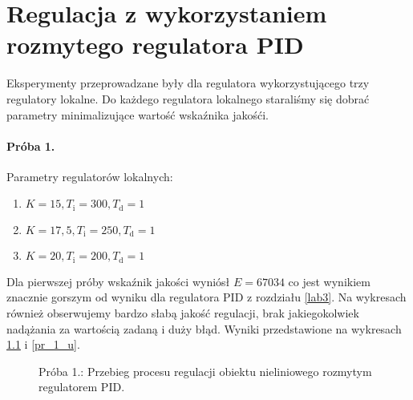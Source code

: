 \chapter{Regulacja z wykorzystaniem rozmytego regulatora PID}
\label{lab4}

Eksperymenty przeprowadzane były dla regulatora wykorzystującego trzy regulatory lokalne. Do każdego regulatora lokalnego staraliśmy się dobrać parametry minimalizujące wartość wskaźnika jakośći.

\subsubsection{Próba 1.}
Parametry regulatorów lokalnych:
\begin{enumerate}
\item $K = 15, T_{\mathrm{i}} = 300,  T_{\mathrm{d}} = 1$
\item $K = 17,5, T_{\mathrm{i}} = 250,  T_{\mathrm{d}} = 1$
\item $K = 20, T_{\mathrm{i}} = 200,  T_{\mathrm{d}} = 1$
\end{enumerate}

Dla pierwszej próby wskaźnik jakości wyniósł $E = \num{67034}$ co jest wynikiem znacznie gorszym od wyniku dla regulatora PID z rozdziału \ref{lab3}. Na wykresach również obserwujemy bardzo słabą jakość regulacji, brak jakiegokolwiek nadążania za wartością zadaną i duży błąd. Wyniki przedstawione na wykresach \ref{pr_1_y} i \ref{pr_1_u}.

\begin{figure}[t]
    \centering
    \caption{Próba 1.: Przebieg procesu regulacji obiektu nieliniowego rozmytym regulatorem PID.}
    \label{pr_1_y}
\end{figure}


